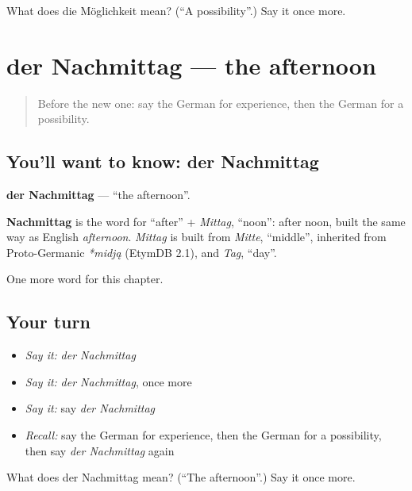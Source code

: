 \begin{tcolorbox}[breakable,colback=teal!4,colframe=teal!35!black,title={Before you move on}]
What does die Möglichkeit mean? (\textquotedblleft{}A possibility\textquotedblright{}.) Say it once more.
\end{tcolorbox}
\section[der Nachmittag]{der Nachmittag — the afternoon}

\label{lesson:GE-C166-nachmittag}



\begin{quote}
Before the new one: say the German for experience, then the German for a possibility.
\end{quote}

\subsection*{You'll want to know: der Nachmittag}
\textbf{der Nachmittag} — \textquotedblleft{}the afternoon\textquotedblright{}.

\begin{cousinweb}
\textbf{Nachmittag} is the word for \textquotedblleft{}after\textquotedblright{} + \emph{Mittag}, \textquotedblleft{}noon\textquotedblright{}: after noon, built the same way as English \emph{afternoon}. \emph{Mittag} is built from \emph{Mitte}, \textquotedblleft{}middle\textquotedblright{}, inherited from Proto-Germanic \emph{*midją} (EtymDB 2.1), and \emph{Tag}, \textquotedblleft{}day\textquotedblright{}.
\end{cousinweb}

\begin{grammarlens}[title={What you've built}]
One more word for this chapter.
\end{grammarlens}

\subsection*{Your turn}
\begin{itemize}
\raggedright
  \item \emph{Say it:} \emph{der Nachmittag}
  \item \emph{Say it:} \emph{der Nachmittag}, once more
  \item \emph{Say it:} say \emph{der Nachmittag}
  \item \emph{Recall:} say the German for experience, then the German for a possibility, then say \emph{der Nachmittag} again
\end{itemize}

\begin{tcolorbox}[breakable,colback=teal!4,colframe=teal!35!black,title={Before you move on}]
What does der Nachmittag mean? (\textquotedblleft{}The afternoon\textquotedblright{}.) Say it once more.
\end{tcolorbox}
